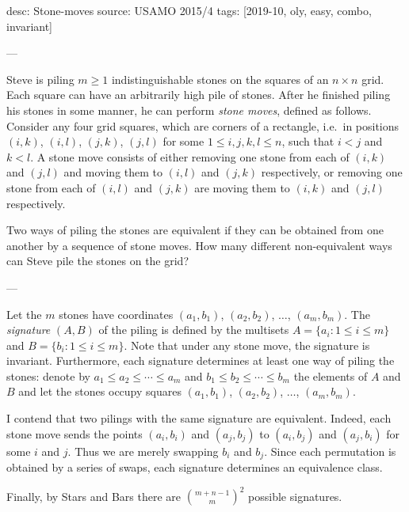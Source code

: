 desc: Stone-moves
source: USAMO 2015/4
tags: [2019-10, oly, easy, combo, invariant]

---

Steve is piling $m\ge 1$ indistinguishable stones on the squares of an $n\times n$ grid. Each square can have an arbitrarily high pile of stones. After he finished piling his stones in some manner, he can perform \emph{stone moves}, defined as follows. Consider any four grid squares, which are corners of a rectangle, i.e.\ in positions $(i,k)$, $(i,l)$, $(j,k)$, $(j,l)$ for some $1\le i,j,k,l\le n$, such that $i<j$ and $k<l$. A stone move consists of either removing one stone from each of $(i,k)$ and $(j,l)$ and moving them to $(i,l)$ and $(j,k)$ respectively, or removing one stone from each of $(i,l)$ and $(j,k)$ are moving them to $(i,k)$ and $(j,l)$ respectively.

Two ways of piling the stones are equivalent if they can be obtained from one another by a sequence of stone moves. How many different non-equivalent ways can Steve pile the stones on the grid?

---

Let the $m$ stones have coordinates $(a_1,b_1)$, $(a_2,b_2)$, $\ldots$, $(a_m,b_m)$. The \emph{signature} $(A,B)$ of the piling is defined by the multisets $A=\{a_i:1\le i\le m\}$ and $B=\{b_i:1\le i\le m\}$. Note that under any stone move, the signature is invariant. Furthermore, each signature determines at least one way of piling the stones: denote by $a_1\le a_2\le\cdots\le a_m$ and $b_1\le b_2\le\cdots\le b_m$ the elements of $A$ and $B$ and let the stones occupy squares $(a_1,b_1)$, $(a_2,b_2)$, $\ldots$, $(a_m,b_m)$.

I contend that two pilings with the same signature are equivalent. Indeed, each stone move sends the points $(a_i,b_i)$ and $(a_j,b_j)$ to $(a_i,b_j)$ and $(a_j,b_i)$ for some $i$ and $j$. Thus we are merely swapping $b_i$ and $b_j$. Since each permutation is obtained by a series of swaps, each signature determines an equivalence class.

Finally, by Stars and Bars there are $\binom{m+n-1}m^2$ possible signatures.

